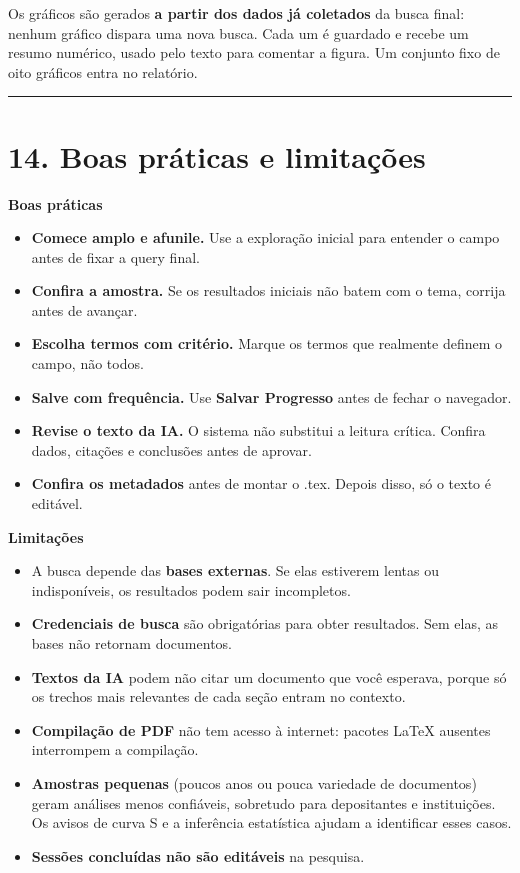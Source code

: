 \documentclass[
  brazilian,
  a4paper,12pt,oneside]{report}
\providecommand{\tightlist}{%
  \setlength{\itemsep}{0pt}\setlength{\parskip}{0pt}}
\begin{document}
Os gráficos são gerados \textbf{a partir dos dados já coletados} da
busca final: nenhum gráfico dispara uma nova busca. Cada um é guardado e
recebe um resumo numérico, usado pelo texto para comentar a figura. Um
conjunto fixo de oito gráficos entra no relatório.

\begin{center}\rule{0.5\linewidth}{0.5pt}\end{center}

\chapter{14. Boas práticas e
limitações}\label{boas-pruxe1ticas-e-limitauxe7uxf5es}

\textbf{Boas práticas}

\begin{itemize}
\tightlist
\item
  \textbf{Comece amplo e afunile.} Use a exploração inicial para
  entender o campo antes de fixar a query final.
\item
  \textbf{Confira a amostra.} Se os resultados iniciais não batem com o
  tema, corrija antes de avançar.
\item
  \textbf{Escolha termos com critério.} Marque os termos que realmente
  definem o campo, não todos.
\item
  \textbf{Salve com frequência.} Use \textbf{Salvar Progresso} antes de
  fechar o navegador.
\item
  \textbf{Revise o texto da IA.} O sistema não substitui a leitura
  crítica. Confira dados, citações e conclusões antes de aprovar.
\item
  \textbf{Confira os metadados} antes de montar o .tex. Depois disso, só
  o texto é editável.
\end{itemize}

\textbf{Limitações}

\begin{itemize}
\tightlist
\item
  A busca depende das \textbf{bases externas}. Se elas estiverem lentas
  ou indisponíveis, os resultados podem sair incompletos.
\item
  \textbf{Credenciais de busca} são obrigatórias para obter resultados.
  Sem elas, as bases não retornam documentos.
\item
  \textbf{Textos da IA} podem não citar um documento que você esperava,
  porque só os trechos mais relevantes de cada seção entram no contexto.
\item
  \textbf{Compilação de PDF} não tem acesso à internet: pacotes LaTeX
  ausentes interrompem a compilação.
\item
  \textbf{Amostras pequenas} (poucos anos ou pouca variedade de
  documentos) geram análises menos confiáveis, sobretudo para
  depositantes e instituições. Os avisos de curva S e a inferência
  estatística ajudam a identificar esses casos.
\item
  \textbf{Sessões concluídas não são editáveis} na pesquisa.
\end{itemize}
\end{document}
